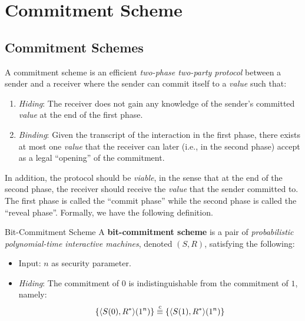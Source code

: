 \section{Commitment Scheme}
\subsection{Commitment Schemes}
A commitment scheme is an efficient {\it two-phase two-party protocol\/} between a sender and a receiver where the sender can commit itself to a {\it value\/} such that:
\begin{enumerate}
\item {\it Hiding\/}: The receiver does not gain any knowledge of the sender's committed {\it value\/} at the end of the first phase.
\item {\it Binding\/}: Given the transcript of the interaction in the first phase, there exists at most one {\it value\/} that the receiver can later (i.e., in the second phase) accept as a legal ``opening'' of the commitment.
\end{enumerate}
In addition, the protocol should be {\it viable\/}, in the sense that at the end of the second phase, the receiver should receive the {\it value\/} that the sender committed to. The first phase is called the ``commit phase'' while the second phase is called the ``reveal phase''. Formally, we have the following definition.
\begin{definition}{Bit-Commitment Scheme} A {\bf bit-commitment scheme} is a pair of {\it probabilistic polynomial-time interactive machines\/}, denoted $(S,R)$, satisfying the following:
\begin{itemize}
\item Input: $n$ as security parameter.
\item {\it Hiding\/}: The commitment of $0$ is indistinguishable from the commitment of $1$, namely:
$$
    \{\langle S(0),R^*\rangle(1^n)\}\stackrel{c}{\equiv}\{\langle S(1),R^*\rangle(1^n)\}
$$
\end{itemize}
\end{definition}